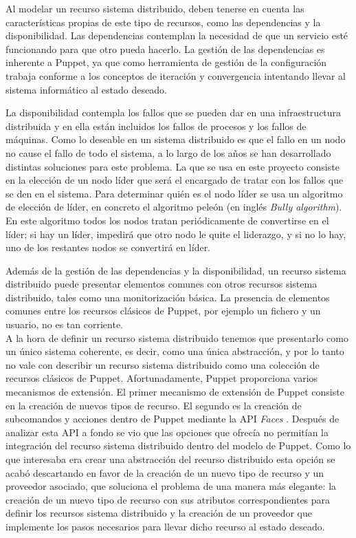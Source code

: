 Al modelar un recurso sistema distribuido, deben tenerse en cuenta las características propias de este tipo de recursos, como las dependencias y la disponibilidad. Las dependencias contemplan la necesidad de que un servicio esté funcionando para que otro pueda hacerlo. La gestión de las dependencias es inherente a Puppet, ya que como herramienta de gestión de la configuración trabaja conforme a los conceptos de iteración y convergencia intentando llevar al sistema informático al estado deseado.

La disponibilidad contempla los fallos que se pueden dar en una infraestructura distribuida y en ella están incluidos los fallos de procesos y los fallos de máquinas. Como lo deseable en un sistema distribuido es que el fallo en un nodo no cause el fallo de todo el sistema, a lo largo de los años se han desarrollado distintas soluciones para este problema. La que se usa en este proyecto consiste en la elección de un nodo líder que será el encargado de tratar con los fallos que se den en el sistema. Para determinar quién es el nodo líder se usa un algoritmo de elección de líder, en concreto el algoritmo peleón (en inglés \emph{Bully algorithm}). En este algoritmo todos los nodos tratan periódicamente de convertirse en el líder; si hay un líder, impedirá que otro nodo le quite el liderazgo, y si no lo hay, uno de los restantes nodos se convertirá en líder.

Además de la gestión de las dependencias y la disponibilidad, un recurso sistema distribuido puede presentar elementos comunes con otros recursos sistema distribuido, tales como una monitorización básica. La presencia de elementos comunes entre los recursos clásicos de Puppet, por ejemplo un fichero y un usuario, no es tan corriente. \\

A la hora de definir un recurso sistema distribuido tenemos que presentarlo como un único sistema coherente, es decir, como una única abstracción, y por lo tanto no vale con describir un recurso sistema distribuido como una colección de recursos clásicos de Puppet. Afortunadamente, Puppet proporciona varios mecanismos de extensión. El primer mecanismo de extensión de Puppet consiste en la creación de nuevos tipos de recurso. El segundo es la creación de subcomandos y acciones dentro de Puppet mediante la API \emph{Faces} \cite{puppet-faces}. Después de analizar esta API a fondo se vio que las opciones que ofrecía no permitían la integración del recurso sistema distribuido dentro del modelo de Puppet. Como lo que interesaba era crear una abstracción del recurso distribuido esta opción se acabó descartando en favor de la creación de un nuevo tipo de recurso y un proveedor asociado, que soluciona el problema de una manera más elegante: la creación de un nuevo tipo de recurso con sus atributos correspondientes para definir los recursos sistema distribuido y la creación de un proveedor que implemente los pasos necesarios para llevar dicho recurso al estado deseado.


